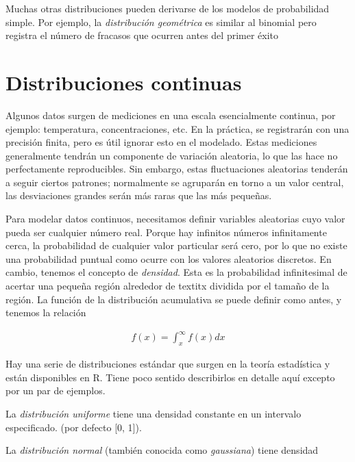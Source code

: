 Muchas otras distribuciones pueden derivarse de los modelos de probabilidad
simple. Por ejemplo, la \textit{distribución geométrica} es similar al binomial
pero registra el número de fracasos que ocurren antes del primer éxito

\section{Distribuciones continuas}

Algunos datos surgen de mediciones en una escala esencialmente continua, por
ejemplo: temperatura, concentraciones, etc. En la práctica, se
registrarán con una precisión finita, pero es útil ignorar esto en el modelado.
Estas mediciones generalmente tendrán un componente de variación aleatoria, lo
que las hace no perfectamente reproducibles. Sin embargo, estas
fluctuaciones aleatorias tenderán a seguir ciertos patrones; normalmente se agruparán en
torno a un valor central, las desviaciones grandes serán más raras que las más
pequeñas.


Para modelar datos continuos, necesitamos definir variables aleatorias cuyo
valor pueda ser cualquier número real. Porque hay infinitos números
infinitamente cerca, la probabilidad de cualquier valor particular será cero,
por lo que no existe una probabilidad puntual como ocurre con los valores
aleatorios discretos. En cambio, tenemos el concepto de \textit{densidad}. Esta
es la probabilidad infinitesimal de acertar una pequeña región alrededor de
textit{x} dividida por el tamaño de la región. La función de la distribución acumulativa
se puede definir como antes, y tenemos la relación

\begingroup
\Large
\begin{gather*}
    f(x) =\int_{x}^{\infty}f(x)dx
\end{gather*}
\endgroup

Hay una serie de distribuciones estándar que surgen en la teoría estadística y
están disponibles en R. Tiene poco sentido describirlos en detalle  aquí excepto
por un par de ejemplos.

La \textit{distribución uniforme} tiene una densidad constante en un intervalo
especificado. (por defecto [0, 1]).

La \textit{distribución normal}  (también conocida como \textit{gaussiana}) tiene
densidad

